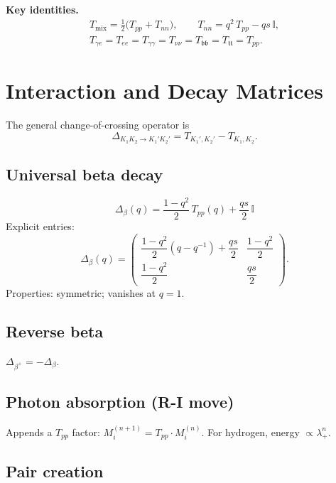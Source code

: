 \documentclass[12pt,a4paper]{article}
\newcommand{\II}{\mathbb{I}}
\begin{document}
\noindent\textbf{Key identities.}
\begin{gather*}
  T_{\mathrm{mix}}
    = \tfrac{1}{2}\bigl(T_{pp} + T_{nn}\bigr), \qquad
  T_{nn} = q^2\, T_{pp} - qs\,\II, \\[4pt]
  T_{\gamma e} = T_{ee} = T_{\gamma\gamma}
    = T_{\nu\nu} = T_{\mathfrak{bb}} = T_{\mathfrak{tt}} = T_{pp}.
\end{gather*}

\section{Interaction and Decay Matrices}

The general change-of-crossing operator is
\[
  \Delta_{K_1 K_2 \to K_1' K_2'}
  = T_{K_1', K_2'} - T_{K_1, K_2}.
\]

\subsection*{Universal beta decay}

\[
  \boxed{\Delta_\beta(q)
  = \frac{1-q^2}{2}\,T_{pp}(q) + \frac{qs}{2}\,\II}
\]
Explicit entries:
\[
  \Delta_\beta(q)
  = \begin{pmatrix}
      \dfrac{1-q^2}{2}(q - q^{-1}) + \dfrac{qs}{2}
        & \dfrac{1-q^2}{2} \\[6pt]
      \dfrac{1-q^2}{2}
        & \dfrac{qs}{2}
    \end{pmatrix}.
\]
Properties: symmetric; vanishes at $q = 1$.

\subsection*{Reverse beta}

$\Delta_{\beta^+} = -\Delta_\beta$.

\subsection*{Photon absorption (R-I move)}

Appends a $T_{pp}$ factor:
$M_i^{(n+1)} = T_{pp} \cdot M_i^{(n)}$.
For hydrogen, energy $\propto \lambda_+^n$.

\subsection*{Pair creation}
\end{document}
